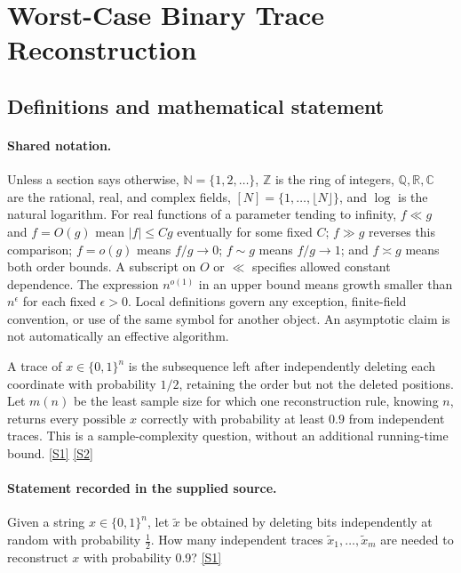 \documentclass[11pt,a4paper]{article}
\newcommand{\N}{\mathbb{N}}
\newcommand{\Z}{\mathbb{Z}}
\newcommand{\Q}{\mathbb{Q}}
\newcommand{\R}{\mathbb{R}}
\newcommand{\C}{\mathbb{C}}
\newcommand{\sref}[2]{\hyperlink{source:#1:#2}{[S#2]}}
\begin{document}
\section{Worst-Case Binary Trace Reconstruction}\label{statement}


\subsection{Definitions and mathematical statement}

\paragraph{Shared notation.}Unless a section says otherwise, $\N=\{1,2,\ldots\}$,
$\Z$ is the ring of integers, $\Q,\R,\C$ are the rational, real, and complex
fields, $[N]=\{1,\ldots,\lfloor N\rfloor\}$, and $\log$ is the natural
logarithm. For real functions of a parameter tending to infinity,
$f\ll g$ and $f=O(g)$ mean $|f|\leq Cg$ eventually for some fixed $C$;
$f\gg g$ reverses this comparison; $f=o(g)$ means $f/g\to0$;
$f\sim g$ means $f/g\to1$; and $f\asymp g$ means both order bounds.
A subscript on $O$ or $\ll$ specifies allowed constant dependence.
The expression $n^{o(1)}$ in an upper bound means growth smaller than
$n^\epsilon$ for each fixed $\epsilon>0$. Local definitions govern any
exception, finite-field convention, or use of the same symbol for another
object. An asymptotic claim is not automatically an effective algorithm.



A trace of $x\in\{0,1\}^n$ is the subsequence left after independently deleting each coordinate with probability $1/2$, retaining the order but not the deleted positions. Let $m(n)$ be the least sample size for which one reconstruction rule, knowing $n$, returns every possible $x$ correctly with probability at least $0.9$ from independent traces. This is a sample-complexity question, without an additional running-time bound. \sref{statement}{1} \sref{statement}{2}

\paragraph{Statement recorded in the supplied source.}
Given a string $x \in \{0, 1\}^n$, let $\tilde{x}$ be obtained by deleting bits independently at random with probability $\frac{1}{2}$. How many independent traces $\tilde{x}_1, \dots, \tilde{x}_m$ are needed to reconstruct $x$ with probability 0.9? \sref{statement}{1}
\end{document}
